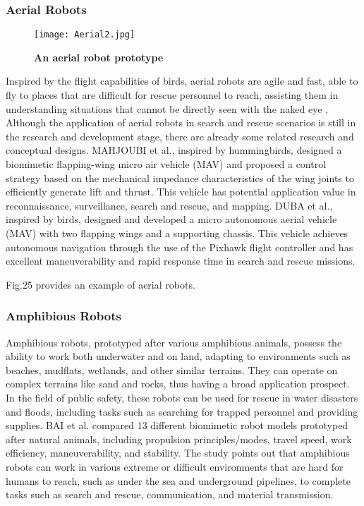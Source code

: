 \documentclass[conference]{IEEEtran}
\begin{document}
\subsubsection{Aerial Robots}
\begin{figure}[h]
    \centering
    \texttt{[image: Aerial2.jpg]}
    \caption{\textbf{An aerial robot prototype}}
    \label{fig:enter-label}
\end{figure}
Inspired by the flight capabilities of birds, aerial robots are agile and fast, able to fly to places that are difficult for rescue personnel to reach, assisting them in understanding situations that cannot be directly seen with the naked eye \cite{b40}. Although the application of aerial robots in search and rescue scenarios is still in the research and development stage, there are already some related research and conceptual designs. MAHJOUBI et al.\cite{b41}, inspired by hummingbirds, designed a biomimetic flapping-wing micro air vehicle (MAV) and proposed a control strategy based on the mechanical impedance characteristics of the wing joints to efficiently generate lift and thrust. This vehicle has potential application value in reconnaissance, surveillance, search and rescue, and mapping. DUBA et al.\cite{b42}, inspired by birds, designed and developed a micro autonomous aerial vehicle (MAV) with two flapping wings and a supporting chassis. This vehicle achieves autonomous navigation through the use of the Pixhawk flight controller and has excellent maneuverability and rapid response time in search and rescue missions.

Fig.25 provides an example of aerial robots.


\subsubsection{Amphibious Robots}
Amphibious robots, prototyped after various amphibious animals, possess the ability to work both underwater and on land, adapting to environments such as beaches, mudflats, wetlands, and other similar terrains. They can operate on complex terrains like sand and rocks, thus having a broad application prospect. In the field of public safety, these robots can be used for rescue in water disasters and floods, including tasks such as searching for trapped personnel and providing supplies. BAI et al.\cite{b43} compared 13 different biomimetic robot models prototyped after natural animals, including propulsion principles/modes, travel speed, work efficiency, maneuverability, and stability. The study points out that amphibious robots can work in various extreme or difficult environments that are hard for humans to reach, such as under the sea and underground pipelines, to complete tasks such as search and rescue, communication, and material transmission. 
\end{document}
